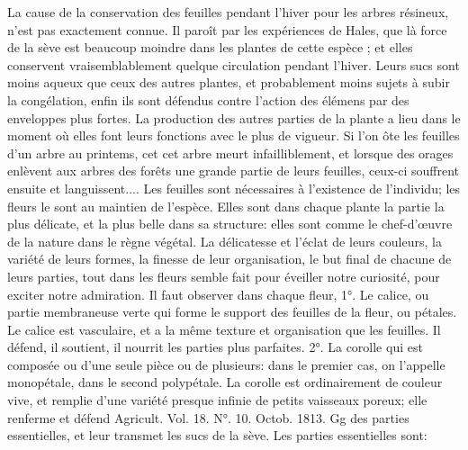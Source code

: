 La cause de la conservation des feuilles pendant l'hiver pour les arbres résineux, n'est pas exactement connue. Il paroît par les expériences de Hales, que là force de la sève est beaucoup moindre dans les plantes de cette espèce ; et elles conservent vraisemblablement quelque circulation pendant l'hiver. Leurs sucs sont moins aqueux que ceux des autres plantes, et probablement moins sujets à subir la congélation, enfin ils sont défendus contre l'action des élémens par des enveloppes plus fortes.
La production des autres parties de la plante a lieu dans le moment où elles font leurs fonctions avec le plus de vigueur. Si l'on ôte les feuilles d'un arbre au printems, cet\setcounter{page}{387} cet arbre meurt infailliblement, et lorsque des orages enlèvent aux arbres des forêts une grande partie de leurs feuilles, ceux-ci souffrent ensuite et languissent....
Les feuilles sont nécessaires à l'existence de l'individu; les fleurs le sont au maintien de l'espèce. Elles sont dans chaque plante la partie la plus délicate, et la plus belle dans sa structure: elles sont comme le chef-d'œuvre de la nature dans le règne végétal. La délicatesse et l'éclat de leurs couleurs, la variété de leurs formes, la finesse de leur organisation, le but final de chacune de leurs parties, tout dans les fleurs semble fait pour éveiller notre curiosité, pour exciter notre admiration.
Il faut observer dans chaque fleur, 1°. Le calice, ou partie membraneuse verte qui forme le support des feuilles de la fleur, ou pétales. Le calice est vasculaire, et a la même texture et organisation que les feuilles. Il défend, il soutient, il nourrit les parties plus parfaites. 2°. La corolle qui est composée ou d'une seule pièce ou de plusieurs: dans le premier cas, on l'appelle monopétale, dans le second polypétale. La corolle est ordinairement de couleur vive, et remplie d'une variété presque infinie de petits vaisseaux poreux; elle renferme et défend
Agricult. Vol. 18. N°. 10. Octob. 1813. Gg\setcounter{page}{388} des parties essentielles, et leur transmet les sucs de la sève. Les parties essentielles sont:
